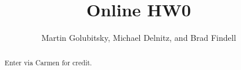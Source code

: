 \documentclass[numbers,nooutcomes,twoside,hints]{xourse}
\title{Online HW0}
\author{Martin Golubitsky, Michael Delnitz, and Brad Findell}
\begin{document}
\begin{abstract}
Enter via Carmen for credit. 
\end{abstract}
\maketitle


\end{document}
